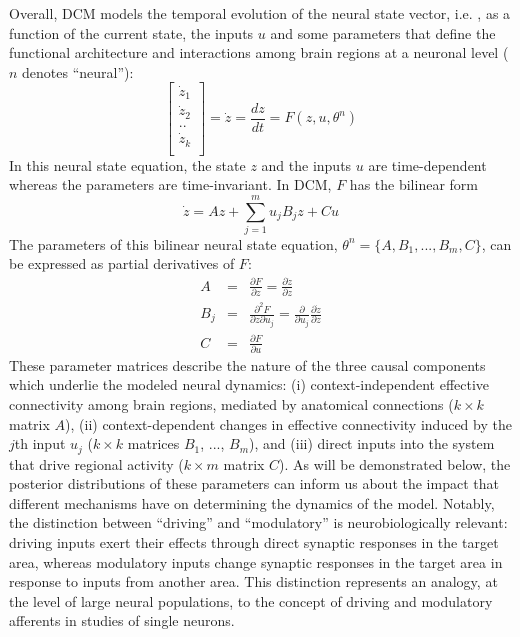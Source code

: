 Overall, DCM models the temporal evolution of the neural state vector, i.e. , as a function of the current state, the inputs $u$ and some parameters  that define the functional architecture and interactions among brain regions at a neuronal level ($n$  denotes ``neural''):
\begin{equation}
\left[ \begin{array}{l}
  \dot{z}_1 \\
  \dot{z}_2 \\
  .. \\
  \dot{z}_k \\  \end{array} \right] = \dot{z}= \frac{dz}{dt} = F(z,u,\theta^n)
\end{equation}
In this neural state equation, the state $z$ and the inputs $u$ are time-dependent whereas the parameters are time-invariant. In DCM, $F$ has the bilinear form
 \begin{equation}
\dot{z}=Az+\sum_{j=1}^m u_j B_j z + Cu
\end{equation}
The parameters of this bilinear neural state equation, $\theta^n=\{A,B_1,...,B_m,C\}$, can be expressed as partial derivatives of $F$:
\begin{eqnarray}
A & = & \frac{\partial F}{\partial z} = \frac{\partial \dot{z}}{\partial z} \\ \nonumber
B_j & = & \frac{\partial^2 F}{\partial z \partial u_j} = \frac{\partial}{\partial u_j}\frac{\partial \dot{z}}{\partial z}  \\ \nonumber
C & = & \frac{\partial F}{\partial u}
\end{eqnarray}
These parameter matrices describe the nature of the three causal components which underlie the modeled neural dynamics:  (i) context-independent effective connectivity among brain regions, mediated by anatomical connections ($k \times k$ matrix $A$), (ii) context-dependent changes in effective connectivity induced by the $j$th input $u_j$ ($k \times k$ matrices $B_1$, ..., $B_m$), and (iii) direct inputs into the system that drive regional activity ($k \times m$ matrix $C$).  As will be demonstrated below, the posterior distributions of these parameters can inform us about the impact that different mechanisms have on determining the dynamics of the model.  Notably, the distinction between ``driving'' and ``modulatory'' is neurobiologically relevant: driving inputs exert their effects through direct synaptic responses in the target area, whereas modulatory inputs change synaptic responses in the target area in response to inputs from another area.  This distinction represents an analogy, at the level of large neural populations, to the concept of driving and modulatory afferents in studies of single neurons.

